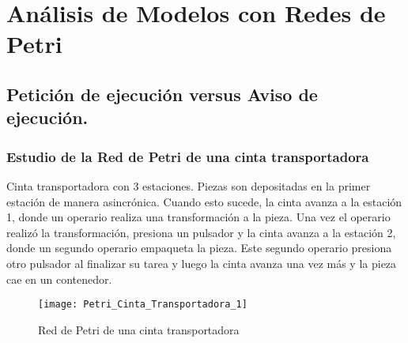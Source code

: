 \section{Análisis de Modelos con Redes de Petri}
\subsection{Petición de ejecución versus Aviso de ejecución.}
\subsubsection{Estudio de la Red de Petri de una cinta transportadora}
Cinta transportadora con 3 estaciones. Piezas son depositadas en la primer
estación  de manera asincrónica. Cuando esto sucede, la cinta avanza a la
estación 1, donde un operario realiza una transformación a la pieza. Una vez el
operario realizó la transformación, presiona un pulsador y la cinta avanza a la
estación 2, donde un segundo operario empaqueta la pieza. Este segundo operario
presiona otro pulsador al finalizar su tarea y luego la cinta avanza una vez
más y la pieza cae en un contenedor.

\begin{figure}[H]
    \centering
    \texttt{[image: Petri\_Cinta\_Transportadora\_1]}
    \caption{Red de Petri de una cinta transportadora}
    \label{fig:petri_cinta_transportadora_1}
\end{figure}

